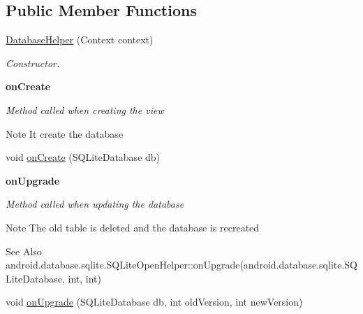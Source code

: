 \subsection*{Public Member Functions}
\begin{DoxyCompactItemize}
\item 
\hyperlink{classnpi_1_1practicaandroid_1_1tutorialnpi_1_1_database_helper_a174e91bd0e05964b72cef1594fcc473a}{Database\-Helper} (Context context)
\begin{DoxyCompactList}\small\item\em Constructor. \end{DoxyCompactList}\end{DoxyCompactItemize}
\begin{Indent}{\bf on\-Create}\par
{\em Method called when creating the view

\begin{DoxyNote}{Note}
It create the database 
\end{DoxyNote}
}\begin{DoxyCompactItemize}
\item 
void \hyperlink{classnpi_1_1practicaandroid_1_1tutorialnpi_1_1_database_helper_abc388b15e9868b07fc01d4b271af1634}{on\-Create} (S\-Q\-Lite\-Database db)
\end{DoxyCompactItemize}
\end{Indent}
\begin{Indent}{\bf on\-Upgrade}\par
{\em Method called when updating the database

\begin{DoxyNote}{Note}
The old table is deleted and the database is recreated 
\end{DoxyNote}
\begin{DoxySeeAlso}{See Also}
android.\-database.\-sqlite.\-S\-Q\-Lite\-Open\-Helper\-::on\-Upgrade(android.\-database.\-sqlite.\-S\-Q\-Lite\-Database, int, int) 
\end{DoxySeeAlso}
}\begin{DoxyCompactItemize}
\item 
void \hyperlink{classnpi_1_1practicaandroid_1_1tutorialnpi_1_1_database_helper_a8a09635bd785558f7c7d4d6745eba741}{on\-Upgrade} (S\-Q\-Lite\-Database db, int old\-Version, int new\-Version)
\end{DoxyCompactItemize}
\end{Indent}
